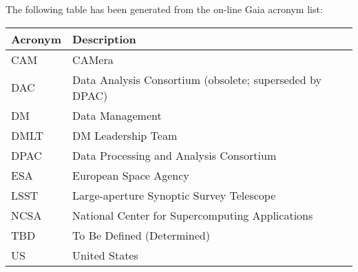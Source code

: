 The following table has been generated from the on-line Gaia acronym list:
\newline\newline%
\addtocounter{table}{-1}
\begin{longtable}{|l|p{}|}\hline 
\textbf{Acronym} & \textbf{Description}  \\\hline
CAM&CAMera \\\hline
DAC&Data Analysis Consortium (obsolete; superseded by DPAC) \\\hline
DM&Data Management \\\hline
DMLT&DM Leadership Team \\\hline
DPAC&Data Processing and Analysis Consortium \\\hline
ESA&European Space Agency \\\hline
LSST&Large-aperture Synoptic Survey Telescope \\\hline
NCSA&National Center for Supercomputing Applications \\\hline
TBD&To Be Defined (Determined) \\\hline
US&United States \\\hline
\end{longtable} 
